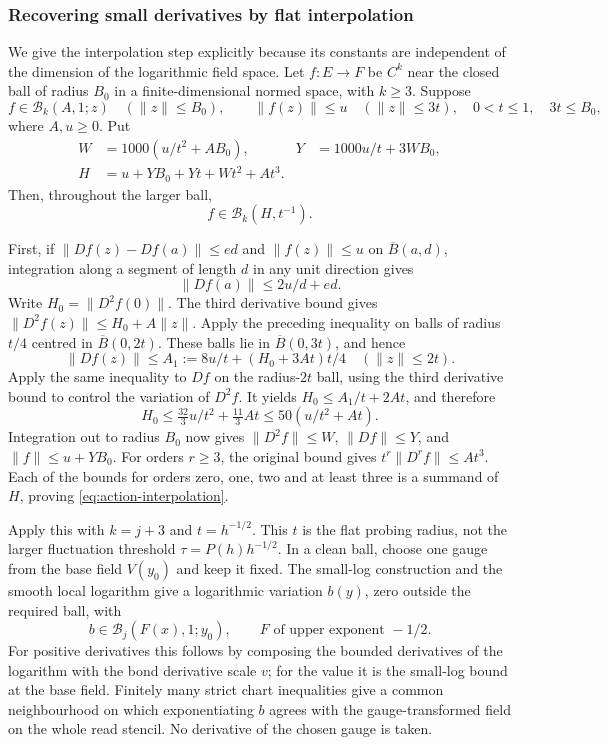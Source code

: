 \subsubsection{Recovering small derivatives by flat interpolation}
We give the interpolation step explicitly because its constants are
independent of the dimension of the logarithmic field space.
Let $f:E\to F$ be $C^k$ near the closed ball of radius $B_0$ in a
finite-dimensional normed space, with $k\ge3$. Suppose
\[
 f\in\mathcal B_k(A,1;z)\quad(\|z\|\le B_0),\qquad
 \|f(z)\|\le u\quad(\|z\|\le3t),
 \quad 0<t\le1,\quad 3t\le B_0,
\]
where $A,u\ge0$. Put
\begin{align*}
 W&=1000(u/t^2+AB_0),&
 Y&=1000u/t+3WB_0,\\
 H&=u+YB_0+Yt+Wt^2+At^3.
\end{align*}
Then, throughout the larger ball,
\begin{equation}\label{eq:action-interpolation}
 f\in\mathcal B_k(H,t^{-1}).
\end{equation}

First, if $\|Df(z)-Df(a)\|\le e d$ and $\|f(z)\|\le u$ on
$\overline B(a,d)$, integration along a segment of length $d$
in any unit direction gives
\[
 \|Df(a)\|\le 2u/d+ed.
\]
Write $H_0=\|D^2f(0)\|$. The third derivative bound gives
$\|D^2f(z)\|\le H_0+A\|z\|$. Apply the preceding inequality on
balls of radius $t/4$ centred in $\overline B(0,2t)$. These balls
lie in $\overline B(0,3t)$, and hence
\[
 \|Df(z)\|\le A_1:=8u/t+(H_0+3At)t/4
 \quad(\|z\|\le2t).
\]
Apply the same inequality to $Df$ on the radius-$2t$ ball, using
the third derivative bound to control the variation of $D^2f$.
It yields $H_0\le A_1/t+2At$, and therefore
\[
 H_0\le \tfrac{32}{3}u/t^2+\tfrac{11}{3}At
       \le50(u/t^2+At).
\]
Integration out to radius $B_0$ now gives $\|D^2f\|\le W$,
$\|Df\|\le Y$, and $\|f\|\le u+YB_0$.
For orders $r\ge3$, the original bound gives
$t^r\|D^rf\|\le At^3$. Each of the bounds for orders zero, one,
two and at least three is a summand of $H$, proving
\eqref{eq:action-interpolation}.

Apply this with $k=j+3$ and $t=h^{-1/2}$. This $t$ is the
flat probing radius, not the larger fluctuation threshold
$\tau=P(h)h^{-1/2}$. In a clean ball, choose one gauge from the
base field $V(y_0)$ and keep it fixed. The small-log construction
and the smooth local logarithm give a logarithmic variation $b(y)$,
zero outside the required ball, with
\[
 b\in\mathcal B_j(F(x),1;y_0),\qquad
 F\text{ of upper exponent }-1/2.
\]
For positive derivatives this follows by composing the bounded
derivatives of the logarithm with the bond derivative scale $v$;
for the value it is the small-log bound at the base field. Finitely
many strict chart inequalities give a common neighbourhood on which
exponentiating $b$ agrees with the gauge-transformed field on the
whole read stencil. No derivative of the chosen gauge is taken.

